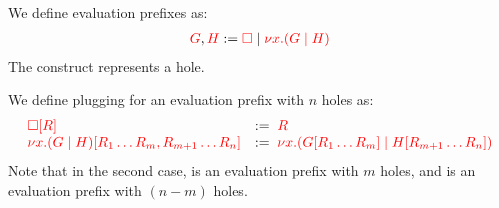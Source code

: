 \begin{definition}\label{def:cp-evaluation-prefixes}
  We define evaluation prefixes as:
  \begin{align*}
    \textcolor{red}{G}, \textcolor{red}{H} := \textcolor{red}{\Box} \mid \textcolor{red}{\nu x.(G \mid H)}
  \end{align*}
  The \tm{\Box} construct represents a hole.
\end{definition}
\begin{definition}[Plugging]\label{def:cp-evaluation-prefix-plugging}
  We define plugging for an evaluation prefix with $n$ holes as:
  \[
    \begin{array}{ll}
      \textcolor{red}{{\Box}[{R}]} & := \; \textcolor{red}{R} \\
      \textcolor{red}{{\nu x.(G \mid H)}[{R_1 \dots R_m, R_{m+1} \dots R_{n}}]}
                            & := \; \textcolor{red}{\nu x.({G}[{R_1 \dots R_m}] \mid {H}[{R_{m+1} \dots R_n}])}
    \end{array}
  \]
  Note that in the second case,  is an evaluation prefix with $m$ holes,
  and  is an evaluation prefix with $(n-m)$ holes.
\end{definition}
